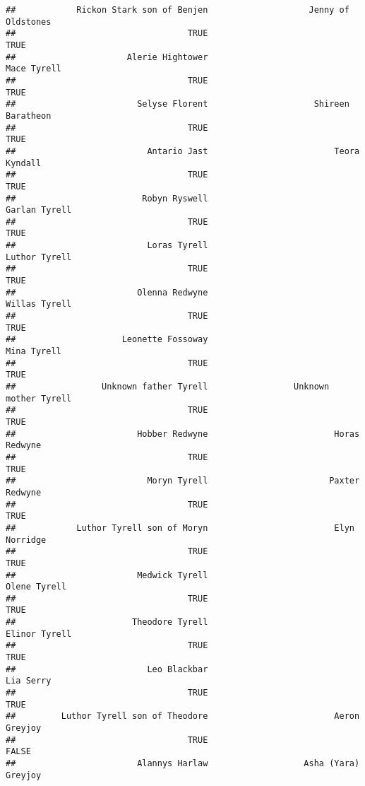\documentclass[
]{book}
\begin{document}
\begin{verbatim}
##            Rickon Stark son of Benjen                    Jenny of Oldstones 
##                                  TRUE                                  TRUE 
##                      Alerie Hightower                           Mace Tyrell 
##                                  TRUE                                  TRUE 
##                        Selyse Florent                     Shireen Baratheon 
##                                  TRUE                                  TRUE 
##                          Antario Jast                         Teora Kyndall 
##                                  TRUE                                  TRUE 
##                         Robyn Ryswell                         Garlan Tyrell 
##                                  TRUE                                  TRUE 
##                          Loras Tyrell                         Luthor Tyrell 
##                                  TRUE                                  TRUE 
##                        Olenna Redwyne                         Willas Tyrell 
##                                  TRUE                                  TRUE 
##                     Leonette Fossoway                           Mina Tyrell 
##                                  TRUE                                  TRUE 
##                 Unknown father Tyrell                 Unknown mother Tyrell 
##                                  TRUE                                  TRUE 
##                        Hobber Redwyne                         Horas Redwyne 
##                                  TRUE                                  TRUE 
##                          Moryn Tyrell                        Paxter Redwyne 
##                                  TRUE                                  TRUE 
##            Luthor Tyrell son of Moryn                         Elyn Norridge 
##                                  TRUE                                  TRUE 
##                        Medwick Tyrell                          Olene Tyrell 
##                                  TRUE                                  TRUE 
##                       Theodore Tyrell                         Elinor Tyrell 
##                                  TRUE                                  TRUE 
##                          Leo Blackbar                             Lia Serry 
##                                  TRUE                                  TRUE 
##         Luthor Tyrell son of Theodore                         Aeron Greyjoy 
##                                  TRUE                                 FALSE 
##                        Alannys Harlaw                   Asha (Yara) Greyjoy 

\end{verbatim}
\end{document}
